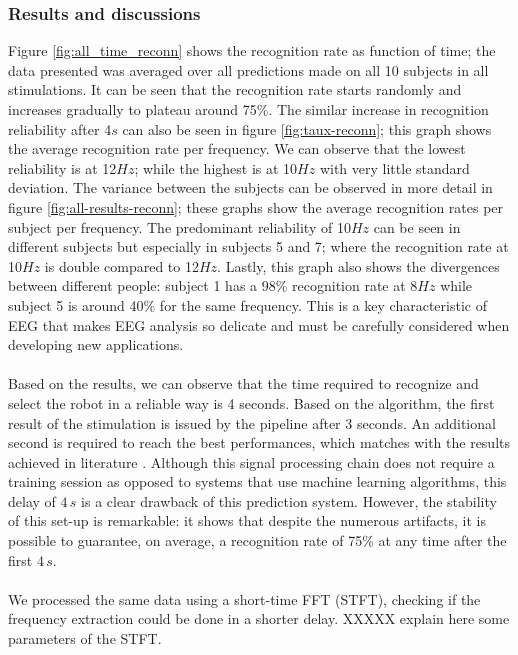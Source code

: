 \documentclass[smallextended]{svjour3}
\begin{document}
\subsubsection{Results and discussions}
Figure \ref{fig:all_time_reconn} shows the recognition rate as function of time; the data presented was averaged over all predictions made on all 10 subjects in all stimulations. It can be seen that the recognition rate starts randomly and increases gradually to plateau around 75\%. The similar increase in recognition reliability after 4$s$ can also be seen in figure \ref{fig:taux-reconn}; this graph shows the average recognition rate per frequency. We can observe that the lowest reliability is at 12$Hz$; while the highest is at 10$Hz$ with very little standard deviation. The variance between the subjects can be observed in more detail in figure \ref{fig:all-results-reconn}; these graphs show the average recognition rates per subject per frequency. The predominant reliability of 10$Hz$ can be seen in different subjects but especially in subjects 5 and 7; where the recognition rate at 10$Hz$ is double compared to 12$Hz$. Lastly, this graph also shows the divergences between different people: subject 1 has a 98\% recognition rate at 8$Hz$ while subject 5 is around 40\% for the same frequency. This is a key characteristic of EEG that makes EEG analysis so delicate and must be carefully considered when developing new applications.\\
\\
Based on the results, we can observe that the time required to recognize and select the robot in a reliable way is 4 seconds. 
Based on the algorithm, the first result of the stimulation is issued by the pipeline after 3 seconds. 
An additional second is required to reach the best performances, which matches with the results achieved in literature \cite{car,SSVEPfiability,jian2014improving,paper4}. 
Although this signal processing chain does not require a training session as opposed to systems that use machine learning algorithms, this delay of $4\,s$ is a clear drawback of this prediction system. 
However, the stability of this set-up is remarkable: it shows that despite the numerous artifacts, it is possible to guarantee, on average, a recognition rate of 75\% at any time after the first $4\,s$. \\
\\
We processed the same data using a short-time FFT (STFT), checking if the frequency extraction could be done in a shorter delay. 
XXXXX explain here some parameters of the STFT.
\end{document}
